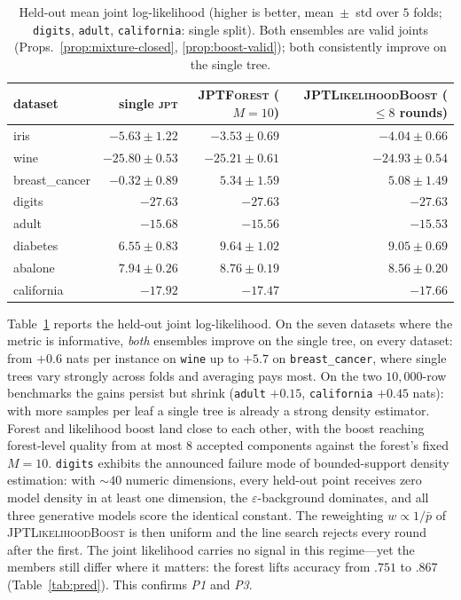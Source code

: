 \documentclass[11pt]{article}
\theoremstyle{plain}
\theoremstyle{definition}
\theoremstyle{remark}
\newcommand{\eps}{\varepsilon}
\newcommand{\jpt}{\textsc{jpt}}
\newcommand{\jptforest}{\textsc{JPTForest}}
\newcommand{\likeboost}{\textsc{JPTLikelihoodBoost}}
\begin{document}
\begin{table}[t]
\centering
\small
\begin{tabular}{lrrr}
\toprule
dataset & single \jpt & \jptforest{} ($M{=}10$) & \likeboost{} ($\le8$ rounds)\\
\midrule
iris & $-5.63 \pm 1.22$ & $\mathbf{-3.53 \pm 0.69}$ & $-4.04 \pm 0.66$ \\
wine & $-25.80 \pm 0.53$ & $-25.21 \pm 0.61$ & $\mathbf{-24.93 \pm 0.54}$ \\
breast\_cancer & $-0.32 \pm 0.89$ & $\mathbf{5.34 \pm 1.59}$ & $5.08 \pm 1.49$ \\
digits & $-27.63$ & $-27.63$ & $-27.63$ \\
adult & $-15.68$ & $-15.56$ & $\mathbf{-15.53}$ \\
diabetes & $6.55 \pm 0.83$ & $\mathbf{9.64 \pm 1.02}$ & $9.05 \pm 0.69$ \\
abalone & $7.94 \pm 0.26$ & $\mathbf{8.76 \pm 0.19}$ & $8.56 \pm 0.20$ \\
california & $-17.92$ & $\mathbf{-17.47}$ & $-17.66$ \\
\bottomrule
\end{tabular}
\caption{Held-out mean joint log-likelihood (higher is better,
mean~$\pm$~std over $5$ folds; \texttt{digits}, \texttt{adult},
\texttt{california}: single split). Both
ensembles are valid joints (Props.~\ref{prop:mixture-closed},
\ref{prop:boost-valid}); both consistently improve on the single tree.}
\label{tab:ll}
\end{table}

Table~\ref{tab:ll} reports the held-out joint log-likelihood.
On the seven
datasets where the metric is informative, \emph{both} ensembles improve
on the single tree, on every dataset: from ${+}0.6$ nats per instance on
\texttt{wine} up to ${+}5.7$ on \texttt{breast\_cancer}, where single
trees vary strongly across folds and averaging pays most. On the two
$10{,}000$-row benchmarks the gains persist but shrink
(\texttt{adult} ${+}0.15$, \texttt{california} ${+}0.45$ nats): with
more samples per leaf a single tree is already a strong density
estimator. Forest and
likelihood boost land close to each other, with the boost reaching
forest-level quality from at most $8$ accepted components against the
forest's fixed $M{=}10$. \texttt{digits} exhibits the announced failure
mode of bounded-support density estimation: with ${\sim}40$ numeric
dimensions, every held-out point receives zero model density in at least
one dimension, the $\eps$-background dominates, and all three generative
models score the identical constant. The reweighting
$w\propto1/\bar p$ of \likeboost{} is then uniform and the line search
rejects every round after the first. The joint likelihood carries no
signal in this regime---yet the members still differ where it matters:
the forest lifts accuracy from $.751$ to $.867$
(Table~\ref{tab:pred}). This confirms \emph{P1} and \emph{P3}.
\end{document}
